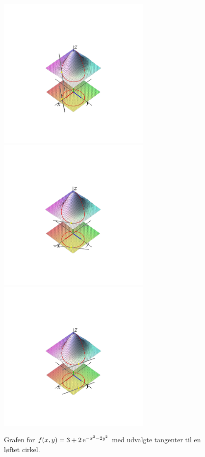 \begin{figure}[ht]
\centerline{ \includegraphics[height=75mm]{plotTang02negB.pdf} \includegraphics[height=75mm]{plotTang02B.pdf} \includegraphics[height=75mm]{plotTang04B.pdf}}
\begin{center}
\caption{Grafen for $f(x,y) = 3 +  2\,\mathrm{e}^{-x^{2} - 2y^{2}}$ med udvalgte tangenter til en løftet cirkel.} \label{figMainFDiverse}
\end{center}
\end{figure}




